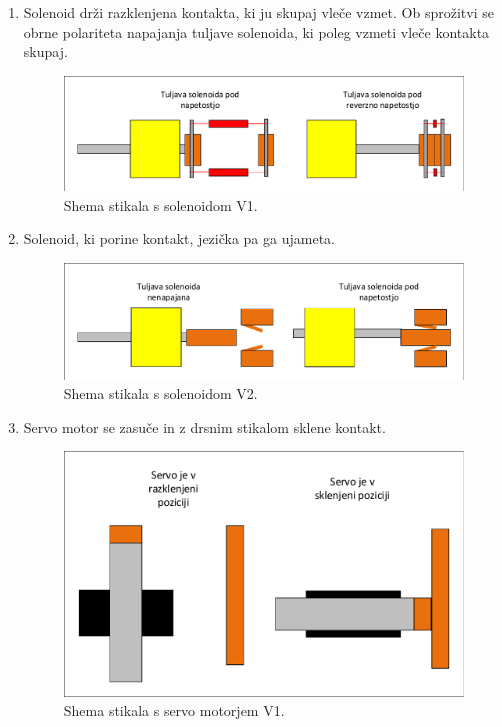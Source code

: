 \documentclass[a4paper,twoside,openright,12pt,Slovene]{book}
\begin{document}
    \begin{enumerate}
        \item  Solenoid drži razklenjena kontakta, ki ju skupaj vleče vzmet. Ob sprožitvi se obrne polariteta napajanja tuljave solenoida, ki poleg vzmeti vleče kontakta skupaj.
    \begin{figure}[H]
        \centering
        \includegraphics[width=1\columnwidth]{Sheme/StikaloSolenoidVerzija1.pdf}
        \caption{\label{/StikaloSolenoidVerzija1} Shema stikala s solenoidom V1.}
    \end{figure}
    
    \item  Solenoid, ki porine kontakt, jezička pa ga ujameta.
    \begin{figure}[H]
        \centering
        \includegraphics[width=1\columnwidth]{Sheme/StikaloSolenoidVerzija2.pdf}
        \caption{\label{/StikaloSolenoidVerzija2} Shema stikala s solenoidom V2.}
    \end{figure}
    
    \pagebreak
    \item  Servo motor se zasuče in z drsnim stikalom sklene kontakt.
    \begin{figure}[H]
        \centering
        \includegraphics[width=0.9\columnwidth]{Sheme/StikaloServoVerzija1.pdf}
        \caption{\label{StikaloServoVerzija1} Shema stikala s servo motorjem V1.}
    \end{figure}
    

\end{enumerate}
\end{document}
